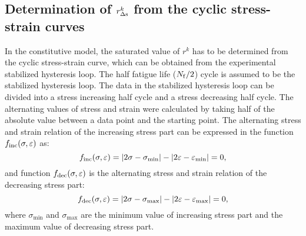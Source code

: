 \subsection{Determination of $r_{\Delta \rm{s}}^k$ from the cyclic stress-strain curves}
\noindent
In the constitutive model, the saturated value of $r^k$ has to be determined from the cyclic stress-strain curve, which can be obtained from the experimental stabilized hysteresis loop.
The half fatigue life ($N_{\rm f}/2$) cycle is assumed to be the stabilized hysteresis loop.
The data in the stabilized hysteresis loop can be divided into a stress increasing half cycle and a stress decreasing half cycle.
The alternating values of stress and strain were calculated by taking half of the absolute value between a data point and the starting point.
The alternating stress and strain relation of the increasing stress part can be expressed in the function $f_{\rm{inc}}(\sigma,\varepsilon)$ as:
\begin{equation}
f_{\rm{inc}}(\sigma,\varepsilon)=|2\sigma-\sigma_{\min}|-|2\varepsilon-\varepsilon_{\min}|=0,
\label{Equ:f_inc}
\end{equation}
and function $f_{\rm{dec}}(\sigma,\varepsilon)$ is the alternating stress and strain relation of the decreasing stress part:
\begin{equation}
f_{\rm{dec}}(\sigma,\varepsilon)=|2\sigma-\sigma_{\max}|-|2\varepsilon-\varepsilon_{\max}|=0,
\label{Equ:f_dec}
\end{equation}
where $\sigma_{\min}$ and $\sigma_{\max}$ are the minimum value of increasing stress part and the maximum value of decreasing stress part.

